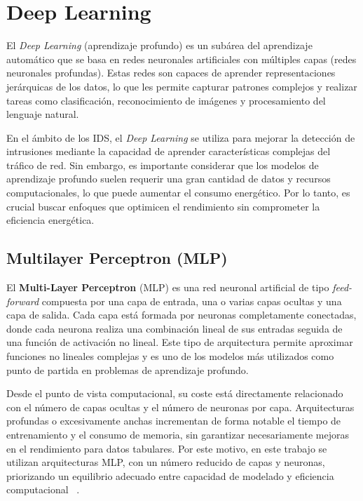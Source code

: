 \section{Deep Learning}

El \textit{Deep Learning} (aprendizaje profundo) es un subárea del aprendizaje automático que se basa en redes neuronales artificiales con múltiples capas (redes neuronales profundas). Estas redes son capaces de aprender representaciones jerárquicas de los datos, lo que les permite capturar patrones complejos y realizar tareas como clasificación, reconocimiento de imágenes y procesamiento del lenguaje natural.

En el ámbito de los IDS, el \textit{Deep Learning} se utiliza para mejorar la detección de intrusiones mediante la capacidad de aprender características complejas del tráfico de red. Sin embargo, es importante considerar que los modelos de aprendizaje profundo suelen requerir una gran cantidad de datos y recursos computacionales, lo que puede aumentar el consumo energético. Por lo tanto, es crucial buscar enfoques que optimicen el rendimiento sin comprometer la eficiencia energética.

\subsection{Multilayer Perceptron (MLP)}

El \textbf{Multi-Layer Perceptron} (MLP) es una red neuronal artificial de tipo \textit{feed-forward} compuesta por una capa de entrada, una o varias capas ocultas y una capa de salida. Cada capa está formada por neuronas completamente conectadas, donde cada neurona realiza una combinación lineal de sus entradas seguida de una función de activación no lineal. Este tipo de arquitectura permite aproximar funciones no lineales complejas y es uno de los modelos más utilizados como punto de partida en problemas de aprendizaje profundo.

Desde el punto de vista computacional, su coste está directamente relacionado con el número de capas ocultas y el número de neuronas por capa. Arquitecturas profundas o excesivamente anchas incrementan de forma notable el tiempo de entrenamiento y el consumo de memoria, sin garantizar necesariamente mejoras en el rendimiento para datos tabulares. Por este motivo, en este trabajo se utilizan arquitecturas MLP, con un número reducido de capas y neuronas, priorizando un equilibrio adecuado entre capacidad de modelado y eficiencia computacional ~\cite{mlp_layers}.


